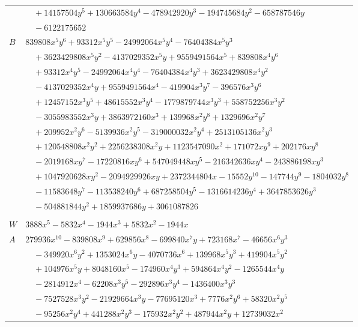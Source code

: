 \documentclass[11pt]{article}
\begin{document}
\begin{longtable}{@{}ll@{}}
 & $\quad +14157504y^{5}+130663584y^{4}-478942920y^{3}-194745684y^{2}-658787546y$\\
 & $\quad -6122175652$\\
$B$ & $839808x^{5}y^{6}+93312x^{5}y^{5}-24992064x^{5}y^{4}-76404384x^{5}y^{3}$\\
 & $\quad +3623429808x^{5}y^{2}-4137029352x^{5}y+9559491564x^{5}+839808x^{4}y^{6}$\\
 & $\quad +93312x^{4}y^{5}-24992064x^{4}y^{4}-76404384x^{4}y^{3}+3623429808x^{4}y^{2}$\\
 & $\quad -4137029352x^{4}y+9559491564x^{4}-419904x^{3}y^{7}-396576x^{3}y^{6}$\\
 & $\quad +12457152x^{3}y^{5}+48615552x^{3}y^{4}-1779879744x^{3}y^{3}+558752256x^{3}y^{2}$\\
 & $\quad -3055983552x^{3}y+3863972160x^{3}+139968x^{2}y^{8}+1329696x^{2}y^{7}$\\
 & $\quad +209952x^{2}y^{6}-5139936x^{2}y^{5}-319000032x^{2}y^{4}+2513105136x^{2}y^{3}$\\
 & $\quad +120548808x^{2}y^{2}+2256238308x^{2}y+1123547090x^{2}+171072xy^{9}+202176xy^{8}$\\
 & $\quad -2019168xy^{7}-17220816xy^{6}+547049448xy^{5}-216342636xy^{4}-243886198xy^{3}$\\
 & $\quad +1047920628xy^{2}-2094929926xy+2372344804x-15552y^{10}-147744y^{9}-1804032y^{8}$\\
 & $\quad -11583648y^{7}-113538240y^{6}+687258504y^{5}-1316614236y^{4}+3647853626y^{3}$\\
 & $\quad -504881844y^{2}+1859937686y+3061087826$\\
\addlinespace[3pt]
\multicolumn{2}{@{}l}{$i=81$, $m=162$, neighbours $19,26,37,55,56,65,78$}\\
$W$ & $3888x^{5}-5832x^{4}-1944x^{3}+5832x^{2}-1944x$\\
$A$ & $279936x^{10}-839808x^{9}+629856x^{8}-699840x^{7}y+723168x^{7}-46656x^{6}y^{3}$\\
 & $\quad -349920x^{6}y^{2}+1353024x^{6}y-4070736x^{6}+139968x^{5}y^{3}+419904x^{5}y^{2}$\\
 & $\quad +104976x^{5}y+8048160x^{5}-174960x^{4}y^{3}+594864x^{4}y^{2}-1265544x^{4}y$\\
 & $\quad -2814912x^{4}-62208x^{3}y^{5}-292896x^{3}y^{4}-1436400x^{3}y^{3}$\\
 & $\quad -7527528x^{3}y^{2}-21929664x^{3}y-77695120x^{3}+7776x^{2}y^{6}+58320x^{2}y^{5}$\\
 & $\quad -95256x^{2}y^{4}+441288x^{2}y^{3}-175932x^{2}y^{2}+487944x^{2}y+12739032x^{2}$\\

\end{longtable}
\end{document}
